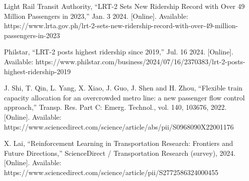 \documentclass{article}
\begin{document}
\begin{thebibliography}{9}

Light Rail Transit Authority, “LRT-2 Sets New Ridership Record with Over 49 Million Passengers in 2023,” Jan. 3 2024. [Online]. Available: https://www.lrta.gov.ph/lrt-2-sets-new-ridership-record-with-over-49-million-passengers-in-2023

Philstar, “LRT-2 posts highest ridership since 2019,” Jul. 16 2024. [Online]. Available: https://www.philstar.com/business/2024/07/16/2370383/lrt-2-posts-highest-ridership-2019

J. Shi, T. Qin, L. Yang, X. Xiao, J. Guo, J. Shen and H. Zhou, “Flexible train capacity allocation for an overcrowded metro line: a new passenger flow control approach,” Transp. Res. Part C: Emerg. Technol., vol. 140, 103676, 2022. [Online]. Available: https://www.sciencedirect.com/science/article/abs/pii/S0968090X22001176

X. Lai, “Reinforcement Learning in Transportation Research: Frontiers and Future Directions,” ScienceDirect / Transportation Research (survey), 2024. [Online]. Available: https://www.sciencedirect.com/science/article/pii/S2772586324000455

\end{thebibliography}
\end{document}
